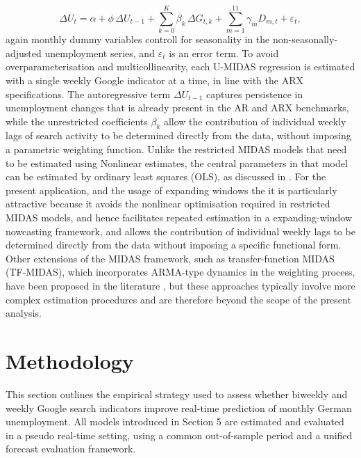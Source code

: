 \documentclass[12pt,a4paper]{article}
\begin{document}
\begin{equation}
    \Delta U_t 
    = \alpha
    + \phi \,\Delta U_{t-1}
    + \sum_{k=0}^{K} \beta_{k}\,\Delta G_{t,k}
    + \sum_{m=1}^{11} \gamma_m D_{m,t}
    + \varepsilon_t,
    \label{eq:umidas}
\end{equation}
again monthly dummy variables controll for seasonality in the non-seasonally-adjusted unemployment series, and $\varepsilon_t$ is an error term. To avoid overparameterisation and multicollinearity, each U-MIDAS regression is estimated with a single weekly Google indicator at a time, in line with the ARX specifications.
The autoregressive term $\Delta U_{t-1}$ captures persistence in unemployment changes that is already present in the AR and ARX benchmarks, while the unrestricted coefficients $\beta_k$ allow the contribution of individual weekly lags of search activity to be determined directly from the data, without imposing a parametric weighting function.
 Unlike the restricted MIDAS models that need to be estimated using Nonlinear estimates, the central parameters in that model can be estimated by ordinary least squares (OLS), as 
discussed in \citet{foroni2015unrestricted}. For the present application, and the usage of expanding windows the it is
particularly attractive because it avoids the nonlinear optimisation required in 
restricted MIDAS models, and hence facilitates repeated estimation in a expanding-window 
nowcasting framework, and allows the contribution of individual weekly lags to be 
determined directly from the data without imposing a specific functional form.
Other extensions of the MIDAS framework, such as transfer-function MIDAS (TF-MIDAS), which incorporates ARMA-type dynamics in the weighting process, have been proposed in the literature \citep{gayoso}, but these approaches typically involve more complex estimation procedures and are therefore beyond the scope of the present analysis.
\section{Methodology}
\label{sec:methodology}
This section outlines the empirical strategy used to assess whether biweekly and weekly Google search indicators improve real-time prediction of monthly German unemployment. All models introduced in Section 5 are estimated and evaluated in a pseudo real-time setting, using a common out-of-sample period and a unified forecast evaluation framework.
\end{document}

